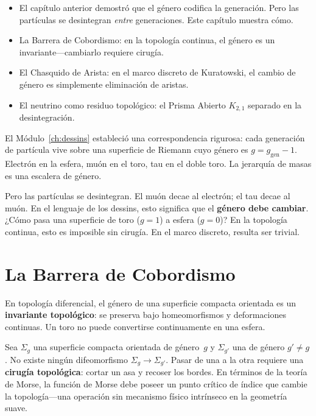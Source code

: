 \documentclass[11pt, a4paper, openany]{book}
\newenvironment{introduction}[1][Sinopsis del M\'odulo]{%
  \begin{tcolorbox}[
    enhanced,colback=structure!5,colframe=structure,
    colbacktitle=structure,coltitle=white,
    fonttitle=\small\bfseries,title={#1},
    arc=2pt,boxrule=0.7pt,
    left=8pt,right=8pt,top=6pt,bottom=6pt,
    before skip=12pt,after skip=12pt
  ]\itshape\begin{itemize}[leftmargin=*,itemsep=2pt,parsep=0pt]
}{%
  \end{itemize}\end{tcolorbox}
}
\begin{document}
\begin{introduction}
  \item El capítulo anterior demostró que el género codifica la
        generación. Pero las partículas se desintegran \emph{entre}
        generaciones. Este capítulo muestra cómo.
  \item La Barrera de Cobordismo: en la topología continua, el género
        es un invariante---cambiarlo requiere cirugía.
  \item El Chasquido de Arista: en el marco discreto de Kuratowski,
        el cambio de género es simplemente eliminación de aristas.
  \item El neutrino como residuo topológico: el Prisma Abierto $K_{2,1}$
        separado en la desintegración.
\end{introduction}

El Módulo~\ref{ch:dessins} estableció una correspondencia rigurosa:
cada generación de partícula vive sobre una superficie de Riemann cuyo
género es $g = g_{\mathrm{gen}} - 1$. Electrón en la esfera, muón en
el toro, tau en el doble toro. La jerarquía de masas es una escalera
de género.

Pero las partículas se desintegran. El muón decae al electrón; el tau
decae al muón. En el lenguaje de los dessins, esto significa que el
\textbf{género debe cambiar}. ¿Cómo pasa una superficie de toro
($g = 1$) a esfera ($g = 0$)? En la topología continua, esto es
imposible sin cirugía. En el marco discreto, resulta ser trivial.

\section{La Barrera de Cobordismo}
\label{sec:barrera-cobordismo}

En topología diferencial, el género de una superficie compacta orientada
es un \textbf{invariante topológico}: se preserva bajo homeomorfismos y
deformaciones continuas. Un toro no puede convertirse continuamente en
una esfera.

\begin{theorem}
\label{thm:barrera-cobordismo}
Sea $\Sigma_g$ una superficie compacta orientada de género~$g$ y
$\Sigma_{g'}$ una de género $g' \neq g$. No existe ningún
difeomorfismo $\Sigma_g \to \Sigma_{g'}$. Pasar de una a la otra
requiere una \textbf{cirugía topológica}: cortar un asa y recoser los
bordes. En términos de la teoría de Morse, la función de Morse debe
poseer un punto crítico de índice que cambie la topología---una
operación sin mecanismo físico intrínseco en la geometría suave.
\end{theorem}
\end{document}
